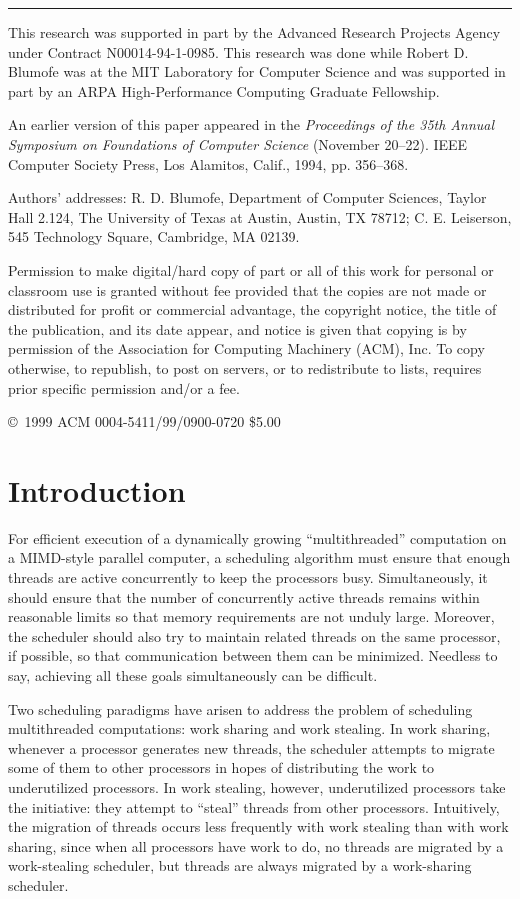 \documentclass{article}
\begin{document}
\vspace{2em}
\noindent\rule{\textwidth}{0.4pt}
\begin{footnotesize}
This research was supported in part by the Advanced Research Projects Agency under Contract N00014-94-1-0985. This research was done while Robert D. Blumofe was at the MIT Laboratory for Computer Science and was supported in part by an ARPA High-Performance Computing Graduate Fellowship.

An earlier version of this paper appeared in the \textit{Proceedings of the 35th Annual Symposium on Foundations of Computer Science} (November 20--22). IEEE Computer Society Press, Los Alamitos, Calif., 1994, pp. 356--368.

Authors' addresses: R. D. Blumofe, Department of Computer Sciences, Taylor Hall 2.124, The University of Texas at Austin, Austin, TX 78712; C. E. Leiserson, 545 Technology Square, Cambridge, MA 02139.

Permission to make digital/hard copy of part or all of this work for personal or classroom use is granted without fee provided that the copies are not made or distributed for profit or commercial advantage, the copyright notice, the title of the publication, and its date appear, and notice is given that copying is by permission of the Association for Computing Machinery (ACM), Inc. To copy otherwise, to republish, to post on servers, or to redistribute to lists, requires prior specific permission and/or a fee.

\copyright\ 1999 ACM 0004-5411/99/0900-0720 \$5.00
\end{footnotesize}

\section{Introduction}
For efficient execution of a dynamically growing ``multithreaded'' computation on a MIMD-style parallel computer, a scheduling algorithm must ensure that enough threads are active concurrently to keep the processors busy. Simultaneously, it should ensure that the number of concurrently active threads remains within reasonable limits so that memory requirements are not unduly large. Moreover, the scheduler should also try to maintain related threads on the same processor, if possible, so that communication between them can be minimized. Needless to say, achieving all these goals simultaneously can be difficult.

Two scheduling paradigms have arisen to address the problem of scheduling multithreaded computations: work sharing and work stealing. In work sharing, whenever a processor generates new threads, the scheduler attempts to migrate some of them to other processors in hopes of distributing the work to underutilized processors. In work stealing, however, underutilized processors take the initiative: they attempt to ``steal'' threads from other processors. Intuitively, the migration of threads occurs less frequently with work stealing than with work sharing, since when all processors have work to do, no threads are migrated by a work-stealing scheduler, but threads are always migrated by a work-sharing scheduler.
\end{document}
